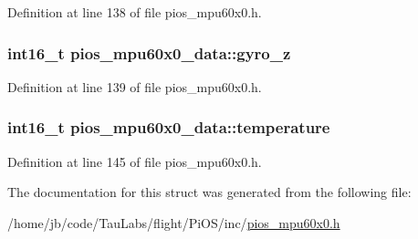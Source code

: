 \-Definition at line 138 of file pios\-\_\-mpu60x0.\-h.

\hypertarget{structpios__mpu60x0__data_a526ba51edf822da11f9a97d1eef8c1e3}{
\subsubsection[{gyro\-\_\-z}]{\setlength{\rightskip}{0pt plus 5cm}int16\-\_\-t {\bf pios\-\_\-mpu60x0\-\_\-data\-::gyro\-\_\-z}}}\label{structpios__mpu60x0__data_a526ba51edf822da11f9a97d1eef8c1e3}


\-Definition at line 139 of file pios\-\_\-mpu60x0.\-h.

\hypertarget{structpios__mpu60x0__data_a799b825b01a55b144c922827bb39d5e1}{
\subsubsection[{temperature}]{\setlength{\rightskip}{0pt plus 5cm}int16\-\_\-t {\bf pios\-\_\-mpu60x0\-\_\-data\-::temperature}}}\label{structpios__mpu60x0__data_a799b825b01a55b144c922827bb39d5e1}


\-Definition at line 145 of file pios\-\_\-mpu60x0.\-h.



\-The documentation for this struct was generated from the following file\-:\begin{DoxyCompactItemize}
\item 
/home/jb/code/\-Tau\-Labs/flight/\-Pi\-O\-S/inc/\hyperlink{pios__mpu60x0_8h}{pios\-\_\-mpu60x0.\-h}\end{DoxyCompactItemize}
